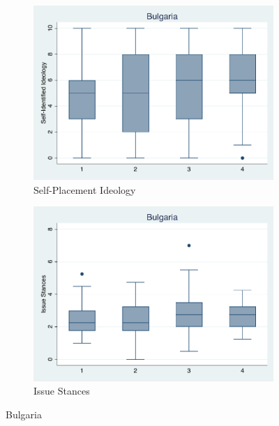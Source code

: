 \documentclass[12pt, titlepage]{article}
\begin{document}
\begin{figure}[H]
	\centering
	\begin{subfigure}[b]{0.475\textwidth}   
		\centering 
		\includegraphics[width=\textwidth]{IdeoBP/Bulgaria}
		\caption{Self-Placement Ideology}
	\end{subfigure}
	\hfill
	\begin{subfigure}[b]{0.475\textwidth}
		\centering 
		\includegraphics[width=\textwidth]{BoxLib/Bulgaria}
		\caption{Issue Stances}
	\end{subfigure}
	\caption{Bulgaria}
	\label{Bulgaria}
\end{figure}
\end{document}
